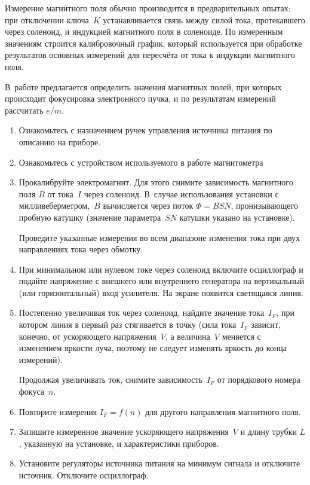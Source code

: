 Измерение магнитного поля обычно производится в предварительных опытах: при
отключении ключа~$K$ устанавливается связь между силой тока, протекавшего через
соленоид, и индукцией магнитного поля в соленоиде. По измеренным значениям
строится калибровочный график, который используется при обработке результатов
основных измерений для пересчёта от тока к индукции магнитного поля.

\begin{lab:task}

В~работе предлагается определить значения магнитных полей, при которых
происходит фокусировка электронного пучка, и по результатам измерений рассчитать
$e/m$.

\begin{enumerate}
\item{Ознакомьтесь с назначением ручек управления источника питания по описанию
на приборе.}
\item{Ознакомьтесь с устройством используемого в работе магнитометра}
\item{Прокалибруйте электромагнит. Для этого снимите зависимость магнитного поля
$B$ от тока~$I$ через соленоид.  В~случае использования установки с
милливеберметром,~$B$ вычисляется через поток $\Phi=BSN$, пронизывающего пробную
катушку (значение параметра~$SN$ катушки указано на установке).

Проведите указанные измерения во всем диапазоне изменения тока при двух
направлениях тока через обмотку.}
\item{При минимальном или нулевом токе через соленоид включите осциллограф  и
подайте напряжение с внешнего или внутреннего генератора на вертикальный (или
горизонтальный) вход усилителя. На экране появится светящаяся линия.}
\item{Постепенно увеличивая ток через соленоид, найдите значение тока~$I_F$, при
котором линия в первый раз стягивается в точку (сила тока~$I_F$ зависит,
конечно, от ускоряющего напряжения~$V$, а величина~$V$ меняется с изменением
яркости луча, поэтому не следует изменять яркость до конца измерений).

Продолжая увеличивать ток, снимите зависимость~$I_F$ от порядкового номера
фокуса~$n$.}
\item{ Повторите измерения $I_F=f(n)$ для другого направления магнитного поля.}
\item{ Запишите измеренное значение ускоряющего напряжения~$V$ и длину трубки
$L$, указанную на установке, и характеристики приборов.}
\item{Установите регуляторы источника питания на минимум сигнала и отключите
источник. Отключите осциллограф.}
\end{enumerate}


\end{lab:task}
